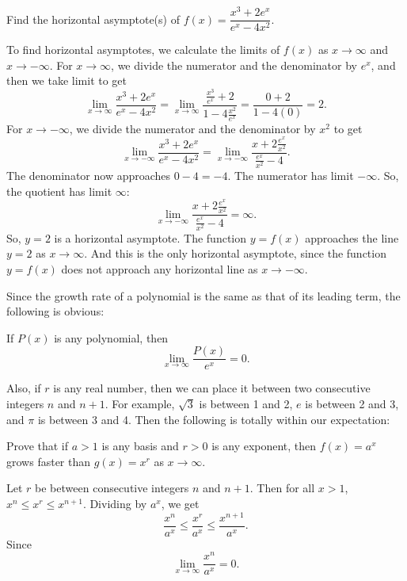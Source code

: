 \begin{example}{}{}
Find the horizontal asymptote(s) of $f(x)=\dfrac{x^3+2e^x}{e^x-4x^2}$.
\end{example}
\begin{solution}
To find horizontal asymptotes, we calculate the limits of $f(x)$
as $x\to \infty$ and $x\to -\infty$. For $x\to \infty$,
we divide the numerator and the denominator by $e^x$,
and then we take limit to get%
\begin{equation*}
\lim_{x\to \infty}\dfrac{x^3+2e^x}{e^x-4x^2}=%
\lim_{x\to \infty}\dfrac{\frac{x^3}{e^x}+2}{1-4\frac{x^2}{e^x}}%
=\frac{0+2}{1-4(0)}=2.
\end{equation*}%
For $x\to -\infty$, we divide the numerator and the denominator by $x^2$ to get 
\begin{equation*}
\lim_{x\to -\infty}\dfrac{x^3+2e^x}{e^x-4x^2}%
=\lim_{x\to -\infty}\dfrac{x+2\frac{e^x}{x^2}}{\frac{e^x}{x^2}-4}.
\end{equation*}%
The denominator now approaches $0-4=-4$. The numerator has limit $-\infty$.
So, the quotient has limit $\infty$: 
\begin{equation*}
\lim_{x\to -\infty}\dfrac{x+2\frac{e^x}{x^2}}{\frac{e^x}{x^2}-4}=\infty.
\end{equation*}%
So, $y=2$ is a horizontal asymptote. The function $y=f(x)$
approaches the line $y=2$ as $x\to \infty$. And this is the only
horizontal asymptote, since the function $y=f(x)$ does not
approach any horizontal line as $x\to -\infty$.
\end{solution}

Since the growth rate of a polynomial is the same as that of its leading
term, the following is obvious:

\begin{example}{}{}
If $P(x)$ is any polynomial, then%
\begin{equation*}
\lim_{x\to \infty}\frac{P(x)}{e^x}=0.
\end{equation*}
\end{example}

Also, if $r$ is any real number, then we can place it between two
consecutive integers $n$ and $n+1.$ For example, $\sqrt{3}$ is between 1 and
2, $e$ is between 2 and 3, and $\pi$ is between 3 and 4. Then the following
is totally within our expectation:

\begin{example}{}{}
Prove that if $a>1$ is any basis and $r>0$ is any exponent,
then $f(x)=a^x$ grows faster than $g(x)=x^r$
as $x\to \infty$.
\end{example}
\begin{solution}
Let $r$ be between consecutive integers $n$ and $n+1$. Then for
all $x>1$, $x^{n}\leq x^{r}\leq x^{n+1}$. Dividing by $a^{x}$, we get%
\begin{equation*}
\frac{x^n}{a^x}\leq \frac{x^r}{a^x}\leq \frac{x^{n+1}}{a^x}.
\end{equation*}%
Since 
\begin{equation*}
\lim_{x\to \infty}\frac{x^n}{a^x}=0.
\end{equation*}
\end{solution}

